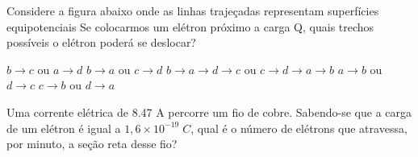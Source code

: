\documentclass[12pt, addpoints]{exam}
\begin{document}
    \begin{questions}
\begin{multicols*}{2}
\question Considere a figura abaixo onde as linhas trajeçadas representam superfícies equipotenciais Se colocarmos um elétron próximo a carga Q, quais trechos possíveis o elétron poderá se deslocar?
        
        \begin{center}
            \begin{minipage}[c]{0.5\linewidth}
            \end{minipage}
        \end{center}
        
        

\begin{choices}
\choice $b\rightarrow c$ ou $a\rightarrow d$ 
\choice $b\rightarrow a$ ou $c\rightarrow d$ 
\choice $b\rightarrow a\rightarrow d\rightarrow c$ ou $c\rightarrow d\rightarrow a\rightarrow b$ 
\choice $a\rightarrow b$ ou $d\rightarrow c$ 
\choice $c\rightarrow b$ ou $d\rightarrow a$ 
\end{choices}
\question Uma corrente elétrica de    8.47 A percorre um ﬁo de cobre. Sabendo-se que a carga de um elétron é igual a $1,6\times 10^{-19}\;C$, qual é o número de elétrons que atravessa, por minuto, a seção reta desse ﬁo?


\end{multicols*}
\end{questions}
\end{document}
